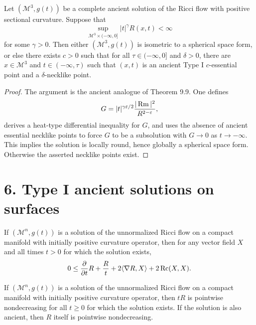 \begin{theorem}
\label{ch09-thm-necklike-points-ancient}
Let \((\mathcal M^3,g(t))\) be a complete ancient solution of the Ricci flow with positive sectional curvature. Suppose that
\[
\sup_{\mathcal M^3\times(-\infty,0]}|t|^\gamma R(x,t)<\infty
\]
for some \(\gamma>0\). Then either \((\mathcal M^3,g(t))\) is isometric to a spherical space form, or else there exists \(c>0\) such that for all \(\tau\in(-\infty,0]\) and \(\delta>0\), there are \(x\in\mathcal M^3\) and \(t\in(-\infty,\tau)\) such that \((x,t)\) is an ancient Type I \(c\)-essential point and a \(\delta\)-necklike point.
\end{theorem}

\begin{proof}
The argument is the ancient analogue of Theorem 9.9. One defines
\[
G=|t|^{\gamma\varepsilon/2}\frac{|\operatorname{Rm}|^2}{R^{2-\varepsilon}},
\]
derives a heat-type differential inequality for \(G\), and uses the absence of ancient essential necklike points to force \(G\) to be a subsolution with \(G\to 0\) as \(t\to-\infty\). This implies the solution is locally round, hence globally a spherical space form. Otherwise the asserted necklike points exist.
\end{proof}

\section*{6. Type I ancient solutions on surfaces}

\begin{proposition}
\label{ch09-prop-lyh-trace-estimate}
If \((\mathcal M^n,g(t))\) is a solution of the unnormalized Ricci flow on a compact manifold with initially positive curvature operator, then for any vector field \(X\) and all times \(t>0\) for which the solution exists,
\[
0 \le \frac{\partial}{\partial t}R + \frac{R}{t} + 2\langle \nabla R, X\rangle + 2\operatorname{Rc}(X,X).
\]
\end{proposition}

\begin{corollary}
\label{ch09-cor-tR-monotone}
If \((\mathcal M^n,g(t))\) is a solution of the unnormalized Ricci flow on a compact manifold with initially positive curvature operator, then \(tR\) is pointwise nondecreasing for all \(t\ge 0\) for which the solution exists. If the solution is also ancient, then \(R\) itself is pointwise nondecreasing.
\end{corollary}

